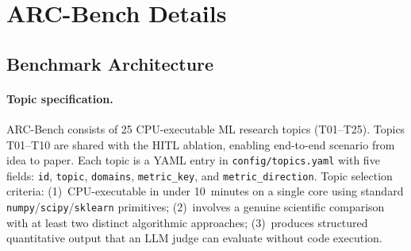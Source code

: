 \section{ARC-Bench Details}
\label{app:arcbench}

\subsection{Benchmark Architecture}
\label{app:arcbench-arch}

\paragraph{Topic specification.}
ARC-Bench consists of 25 CPU-executable ML research topics (T01--T25).
Topics T01--T10 are shared with the HITL ablation, enabling end-to-end scenario from idea to paper.
Each topic is a YAML entry in \texttt{config/topics.yaml} with five fields: \texttt{id}, \texttt{topic}, \texttt{domains}, \texttt{metric\_key}, and \texttt{metric\_direction}.
Topic selection criteria: (1)~CPU-executable in under 10~minutes on a single core using standard \texttt{numpy}/\texttt{scipy}/\texttt{sklearn} primitives; (2)~involves a genuine scientific comparison with at least two distinct algorithmic approaches; (3)~produces structured quantitative output that an LLM judge can evaluate without code execution.


